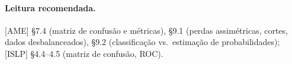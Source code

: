 \documentclass[11pt,a4paper]{article}
\begin{document}
\paragraph{Leitura recomendada.} [AME] §7.4 (matriz de confusão e métricas), §9.1
(perdas assimétricas, cortes, dados desbalanceados), §9.2 (classificação vs.\
estimação de probabilidades); [ISLP] §4.4--4.5 (matriz de confusão, ROC).
\end{document}
